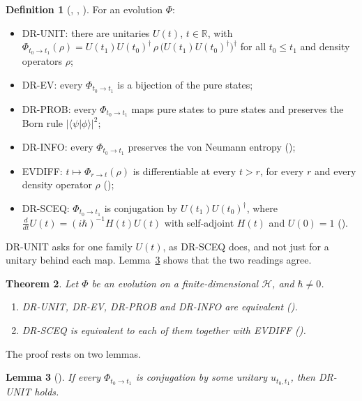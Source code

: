 \documentclass[11pt]{article}
\newtheorem{theorem}{Theorem}[section]
\newtheorem{lemma}[theorem]{Lemma}
\theoremstyle{definition}
\newtheorem{definition}[theorem]{Definition}
\begin{document}
\begin{definition}[, ,
  ]
  For an evolution $\Phi$:
  \begin{itemize}
  \item DR-UNIT: there are unitaries $U(t)$, $t \in \mathbb R$, with
    $\Phi_{t_0\to t_1}(\rho) = U(t_1)U(t_0)^\dagger\,\rho\,\bigl(U(t_1)U(t_0)^\dagger\bigr)^\dagger$
    for all $t_0 \le t_1$ and density operators $\rho$;
  \item DR-EV: every $\Phi_{t_0\to t_1}$ is a bijection of the pure states;
  \item DR-PROB: every $\Phi_{t_0\to t_1}$ maps pure states to pure states and preserves the
    Born rule $|\langle\psi|\phi\rangle|^2$;
  \item DR-INFO: every $\Phi_{t_0\to t_1}$ preserves the von Neumann entropy
    ();
  \item EVDIFF: $t \mapsto \Phi_{r\to t}(\rho)$ is differentiable at every $t > r$, for every
    $r$ and every density operator $\rho$ ();
  \item DR-SCEQ: $\Phi_{t_0\to t_1}$ is conjugation by $U(t_1)U(t_0)^\dagger$, where
    $\frac{d}{dt}U(t) = (i\hbar)^{-1}H(t)U(t)$ with self-adjoint $H(t)$ and $U(0) = 1$
    ().
  \end{itemize}
\end{definition}

DR-UNIT asks for one family $U(t)$, as DR-SCEQ does, and not just for a unitary behind each map.
Lemma~\ref{lem:propagator} shows that the two readings agree.

\begin{theorem}\label{thm:time-dependent}
  Let $\Phi$ be an evolution on a finite-dimensional $\mathcal H$, and $\hbar \ne 0$.
  \begin{enumerate}
  \item DR-UNIT, DR-EV, DR-PROB and DR-INFO are equivalent
    ().
  \item DR-SCEQ is equivalent to each of them together with EVDIFF
    ().
  \end{enumerate}
\end{theorem}

The proof rests on two lemmas.

\begin{lemma}[]
  \label{lem:propagator}
  If every $\Phi_{t_0\to t_1}$ is conjugation by some unitary $u_{t_0,t_1}$, then DR-UNIT holds.
\end{lemma}
\end{document}
